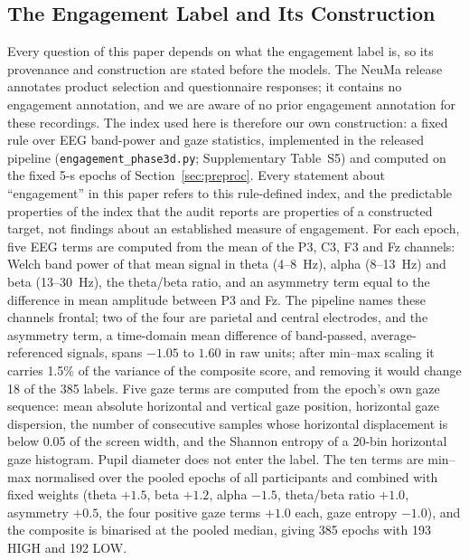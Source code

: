 \subsection{The Engagement Label and Its Construction}\label{sec:label}

Every question of this paper depends on what the engagement label is, so its provenance and construction are stated before the models. The NeuMa release annotates product selection and questionnaire responses; it contains no engagement annotation, and we are aware of no prior engagement annotation for these recordings. The index used here is therefore our own construction: a fixed rule over EEG band-power and gaze statistics, implemented in the released pipeline (\texttt{engagement\_phase3d.py}; Supplementary Table~S5) and computed on the fixed 5-s epochs of Section~\ref{sec:preproc}. Every statement about ``engagement'' in this paper refers to this rule-defined index, and the predictable properties of the index that the audit reports are properties of a constructed target, not findings about an established measure of engagement. For each epoch, five EEG terms are computed from the mean of the P3, C3, F3 and Fz channels: Welch band power of that mean signal in theta (4--8~Hz), alpha (8--13~Hz) and beta (13--30~Hz), the theta/beta ratio, and an asymmetry term equal to the difference in mean amplitude between P3 and Fz. The pipeline names these channels frontal; two of the four are parietal and central electrodes, and the asymmetry term, a time-domain mean difference of band-passed, average-referenced signals, spans $-1.05$ to $1.60$ in raw units; after min--max scaling it carries 1.5\% of the variance of the composite score, and removing it would change 18 of the 385 labels. Five gaze terms are computed from the epoch's own gaze sequence: mean absolute horizontal and vertical gaze position, horizontal gaze dispersion, the number of consecutive samples whose horizontal displacement is below 0.05 of the screen width, and the Shannon entropy of a 20-bin horizontal gaze histogram. Pupil diameter does not enter the label. The ten terms are min--max normalised over the pooled epochs of all participants and combined with fixed weights (theta $+1.5$, beta $+1.2$, alpha $-1.5$, theta/beta ratio $+1.0$, asymmetry $+0.5$, the four positive gaze terms $+1.0$ each, gaze entropy $-1.0$), and the composite is binarised at the pooled median, giving 385 epochs with 193 HIGH and 192 LOW.

